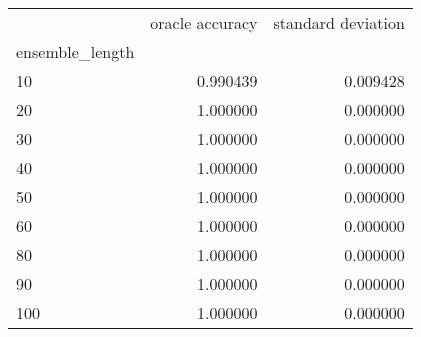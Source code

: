 \begin{tabular}{lrr}
\toprule
{} &  oracle accuracy &  standard deviation \\
ensemble\_length &                  &                     \\
\midrule
10              &         0.990439 &            0.009428 \\
20              &         1.000000 &            0.000000 \\
30              &         1.000000 &            0.000000 \\
40              &         1.000000 &            0.000000 \\
50              &         1.000000 &            0.000000 \\
60              &         1.000000 &            0.000000 \\
80              &         1.000000 &            0.000000 \\
90              &         1.000000 &            0.000000 \\
100             &         1.000000 &            0.000000 \\
\bottomrule
\end{tabular}
